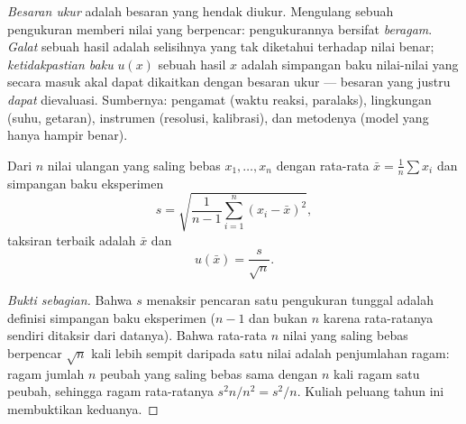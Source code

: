 \begin{definition}\label{def:b1:units-dimensions:uncertainty}
\emph{Besaran ukur} adalah besaran yang hendak diukur. Mengulang sebuah
pengukuran memberi nilai yang berpencar: pengukurannya bersifat
\emph{beragam}. \emph{Galat} sebuah hasil adalah selisihnya yang tak
diketahui terhadap nilai benar; \emph{ketidakpastian baku} $u(x)$
sebuah hasil $x$ adalah simpangan baku nilai-nilai yang secara masuk
akal dapat dikaitkan dengan besaran ukur --- besaran yang justru
\emph{dapat} dievaluasi. Sumbernya: pengamat (waktu reaksi, paralaks),
lingkungan (suhu, getaran), instrumen (resolusi, kalibrasi), dan
metodenya (model yang hanya hampir benar).
\end{definition}

\begin{proposition}\label{prop:b1:units-dimensions:typeA}
Dari $n$ nilai ulangan yang saling bebas $x_1, \dots, x_n$ dengan
rata-rata $\bar x = \frac1n \sum x_i$ dan simpangan baku eksperimen
\[
s = \sqrt{\frac{1}{n-1}\sum_{i=1}^n (x_i - \bar x)^2},
\]
taksiran terbaik  adalah $\bar x$ dan 
\[
u(\bar x) = \frac{s}{\sqrt n} .
\]
\end{proposition}

\begin{proof}[Bukti sebagian]
Bahwa $s$ menaksir pencaran satu pengukuran tunggal adalah definisi
simpangan baku eksperimen ($n - 1$ dan bukan $n$ karena rata-ratanya
sendiri ditaksir dari datanya). Bahwa rata-rata $n$ nilai yang saling
bebas berpencar $\sqrt n$ kali lebih sempit daripada satu nilai adalah
penjumlahan ragam: ragam jumlah $n$ peubah yang saling bebas sama
dengan $n$ kali ragam satu peubah, sehingga ragam rata-ratanya
$s^2 n / n^2 = s^2/n$. Kuliah peluang tahun ini membuktikan keduanya.
\end{proof}


